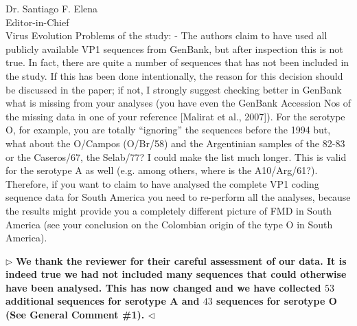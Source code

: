 \documentclass[12pt, a4paper]{letter} %
\newenvironment{reply}{$\triangleright$\bf}{$\triangleleft$}
\begin{document}
\begin{letter}{
	Dr. Santiago F. Elena\\
    Editor-in-Chief \\
    Virus Evolution
}
Problems of the study:
-       The authors claim to have used all publicly available VP1 sequences from GenBank, but after inspection this is not true. 
In fact, there are quite a number of sequences that has not been included in the study. If this has been done intentionally, the reason for this decision should be discussed in the paper; if not, I strongly suggest checking better in GenBank what is missing from your analyses (you have even the GenBank Accession Nos of the missing data in one of your reference [Malirat et al., 2007]). 
For the serotype O, for example, you are totally ``ignoring'' the sequences before the 1994 but, what about the O/Campos (O/Br/58) and the Argentinian samples of the 82-83 or the Caseros/67, the Selab/77? I could make the list much longer. 
This is valid for the serotype A as well (e.g. among others, where is the A10/Arg/61?). 
Therefore, if you want to claim to have analysed the complete VP1 coding sequence data for South America you need to re-perform all the analyses, because the results might provide you a completely different picture of FMD in South America (see your conclusion on the Colombian origin of the type O in South America).

\begin{reply}
We thank the reviewer for their careful assessment of our data.
It is indeed true we had not included many sequences that could otherwise have been analysed.
This has now changed and we have collected $53$ additional sequences for serotype A and $43$ sequences for serotype O (See General Comment \#1).
\end{reply}


\end{letter}
\end{document}

